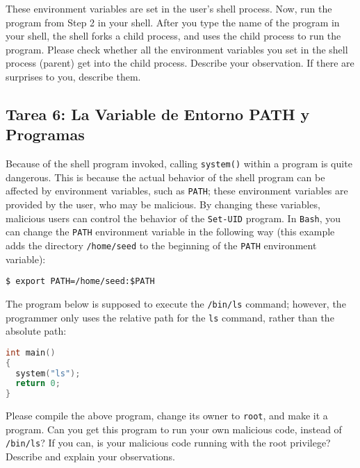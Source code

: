 These environment variables are set in the user's shell process.
Now, run the \setuid program from Step 2 in your shell. After you type the
name of the program in your shell, the shell forks a child process,
and uses the child process to run the program. Please check whether all the
environment variables you set in the shell process (parent) get into
the \setuid child process.  Describe your observation. If there are
surprises to you, describe them.



\subsection{Tarea 6: La Variable de Entorno PATH y Programas \setuid }

Because of the shell program invoked, calling {\tt system()}
within a \setuid program is quite dangerous. This is because the actual behavior of the
shell program can be affected by environment variables, such
as {\tt PATH}; these environment variables are provided by the user, who
may be malicious.  By changing these variables, malicious users can control
the behavior of the {\tt Set-UID} program. In {\tt Bash}, you can
change the {\tt PATH} environment variable in the following way (this example
adds the directory {\tt /home/seed} to the beginning of the {\tt PATH} environment variable):


\begin{lstlisting}
$ export PATH=/home/seed:$PATH
\end{lstlisting}



The \setuid program below is supposed to execute the {\tt /bin/ls} command;
however, the programmer only uses the relative path for the {\tt ls}
command, rather than the absolute path:

\begin{lstlisting}[language=C]
int main()
{
  system("ls");
  return 0;
}
\end{lstlisting}

Please compile the above program, change its owner to {\tt root}, and
make it a \setuid program.  Can you get this \setuid program to
run your own malicious code, instead of
{\tt /bin/ls}?  If you can, is your malicious code running with the root privilege?
Describe and explain your observations. \\


